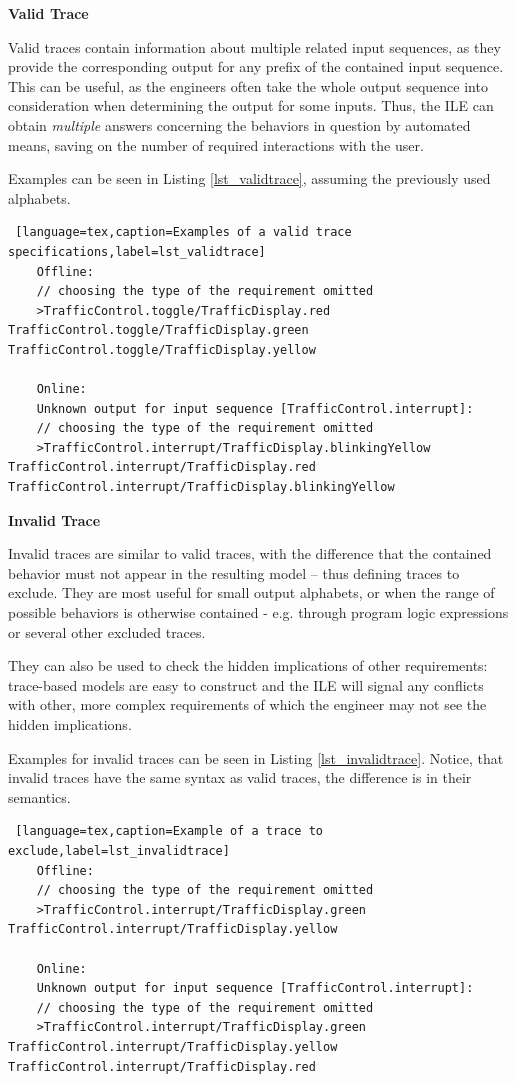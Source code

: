 \textbf{Valid Trace}

Valid traces contain information about multiple related input sequences, as they provide the corresponding output for any prefix of the contained input sequence. This can be useful, as the engineers often take the whole output sequence into consideration when determining the output for some inputs. Thus, the ILE can obtain \textit{multiple} answers concerning the behaviors in question by automated means, saving on the number of required interactions with the user.

Examples can be seen in Listing \ref{lst_validtrace}, assuming the previously used alphabets.

\bigskip
\begin{lstlisting} [language=tex,caption=Examples of a valid trace specifications,label=lst_validtrace]
	Offline:
	// choosing the type of the requirement omitted
	>TrafficControl.toggle/TrafficDisplay.red TrafficControl.toggle/TrafficDisplay.green TrafficControl.toggle/TrafficDisplay.yellow
	
	Online: 
	Unknown output for input sequence [TrafficControl.interrupt]:
	// choosing the type of the requirement omitted
	>TrafficControl.interrupt/TrafficDisplay.blinkingYellow TrafficControl.interrupt/TrafficDisplay.red TrafficControl.interrupt/TrafficDisplay.blinkingYellow
\end{lstlisting}

\textbf{Invalid Trace}

Invalid traces are similar to valid traces, with the difference that the contained behavior must not appear in the resulting model -- thus defining traces to exclude. They are most useful for small output alphabets, or when the range of possible behaviors is otherwise contained - e.g. through program logic expressions or several other excluded traces.

They can also be used to check the hidden implications of other requirements: trace-based models are easy to construct and the ILE will signal any conflicts with other, more complex requirements of which the engineer may not see the hidden implications.

Examples for invalid traces can be seen in Listing \ref{lst_invalidtrace}. Notice, that invalid traces have the same syntax as valid traces, the difference is in their semantics.

\bigskip
\begin{lstlisting} [language=tex,caption=Example of a trace to exclude,label=lst_invalidtrace]
	Offline:
	// choosing the type of the requirement omitted
	>TrafficControl.interrupt/TrafficDisplay.green TrafficControl.interrupt/TrafficDisplay.yellow
	
	Online:
	Unknown output for input sequence [TrafficControl.interrupt]:
	// choosing the type of the requirement omitted
	>TrafficControl.interrupt/TrafficDisplay.green TrafficControl.interrupt/TrafficDisplay.yellow TrafficControl.interrupt/TrafficDisplay.red
\end{lstlisting}

